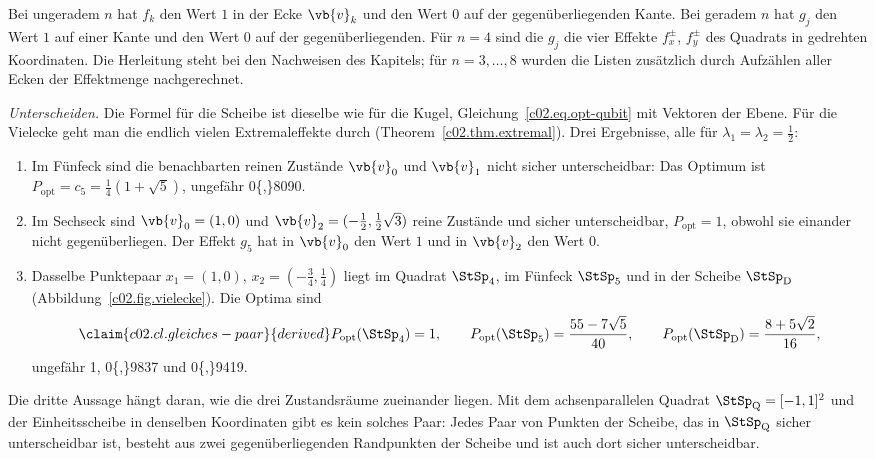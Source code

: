 \begin{vertiefung}
  Bei ungeradem $n$ hat $f_k$ den Wert $1$ in der Ecke $\vb{v}_k$ und den Wert $0$ auf der
  gegenüberliegenden Kante. Bei geradem $n$ hat $g_j$ den Wert $1$ auf einer Kante und den
  Wert $0$ auf der gegenüberliegenden. Für $n = 4$ sind die $g_j$ die vier Effekte
  $f_x^{\pm}$, $f_y^{\pm}$ des Quadrats in gedrehten Koordinaten. Die Herleitung steht bei
  den Nachweisen des Kapitels; für $n = 3, \dots, 8$ wurden die Listen zusätzlich durch
  Aufzählen aller Ecken der Effektmenge nachgerechnet.

  \emph{Unterscheiden.} Die Formel für die Scheibe ist dieselbe wie für die Kugel,
  Gleichung~\eqref{c02.eq.opt-qubit} mit Vektoren der Ebene. Für die Vielecke geht man die
  endlich vielen Extremaleffekte durch (Theorem~\ref{c02.thm.extremal}). Drei Ergebnisse,
  alle für $\lambda_1 = \lambda_2 = \tfrac12$:
  \begin{enumerate}
    \item Im Fünfeck sind die benachbarten reinen Zustände $\vb{v}_0$ und $\vb{v}_1$ nicht
      sicher unterscheidbar: Das Optimum ist
      $P_{\mathrm{opt}} = c_5 = \tfrac14(1 + \sqrt{5})$, ungefähr
      \num[c02.cl.level-p1]{0{,}8090}{}.
    \item Im Sechseck sind $\vb{v}_0 = (1,0)$ und
      $\vb{v}_2 = (-\tfrac12, \tfrac12\sqrt{3})$ reine Zustände und sicher unterscheidbar,
      $P_{\mathrm{opt}} = \num[c02.cl.level-h1]{1}{}$, obwohl sie einander nicht
      gegenüberliegen. Der Effekt $g_5$ hat in $\vb{v}_0$ den Wert $1$ und in $\vb{v}_2$
      den Wert $0$.
    \item Dasselbe Punktepaar $x_1 = (1,0)$, $x_2 = (-\tfrac34, \tfrac14)$ liegt im Quadrat
      $\StSp_4$, im Fünfeck $\StSp_5$ und in der Scheibe $\StSp_{\mathrm{D}}$
      (Abbildung~\ref{c02.fig.vielecke}). Die Optima sind
      \begin{equation}\label{c02.eq.gleiches-paar}\claim{c02.cl.gleiches-paar}{derived}
        P_{\mathrm{opt}}(\StSp_4) = 1, \qquad
        P_{\mathrm{opt}}(\StSp_5) = \frac{55 - 7\sqrt{5}}{40}, \qquad
        P_{\mathrm{opt}}(\StSp_{\mathrm{D}}) = \frac{8 + 5\sqrt{2}}{16} ,
      \end{equation}
      ungefähr \num[c02.cl.level-c1]{1}{}, \num[c02.cl.level-c2]{0{,}9837}{} und
      \num[c02.cl.level-c3]{0{,}9419}{}.
  \end{enumerate}
  Die dritte Aussage hängt daran, wie die drei Zustandsräume zueinander liegen. Mit dem
  achsenparallelen Quadrat $\StSp_{\mathrm{Q}} = [-1,1]^2$ und der Einheitsscheibe in
  denselben Koordinaten gibt es kein solches Paar: Jedes Paar von Punkten der Scheibe, das
  in $\StSp_{\mathrm{Q}}$ sicher unterscheidbar ist, besteht aus zwei gegenüberliegenden
  Randpunkten der Scheibe und ist auch dort sicher unterscheidbar.


\end{vertiefung}
